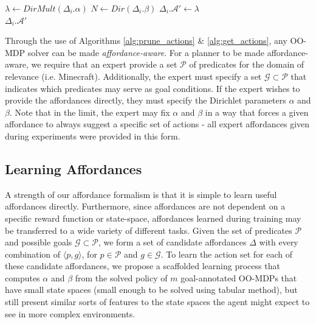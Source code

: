 \documentclass[letterpaper]{article}
\begin{document}
\begin{algorithm}
  \caption{$\Delta_i.getActions(s)$}
  \begin{algorithmic}[1]
    \State $\lambda \leftarrow DirMult(\Delta_i.\alpha)$
    \State $N \leftarrow Dir(\Delta_i.\beta)$
    \State $\Delta_i.\mathcal{A}' \leftarrow \lambda$
    \EndFor \\
    \Return $\Delta_i.\mathcal{A}'$
  \end{algorithmic}
  \label{alg:get_actions}
\end{algorithm}

Through the use of Algorithms \ref{alg:prune_actions} \& \ref{alg:get_actions}, any OO-MDP solver can be made
{\it affordance-aware}. For a planner to be made affordance-aware, we require that an expert provide a set $\mathcal{P}$ of predicates
for the domain of relevance (i.e. Minecraft). Additionally, the expert must specify a set
$\mathcal{G} \subset \mathcal{P}$ that indicates which predicates may serve as goal conditions. If the expert wishes
to provide the affordances directly, they must specify the Dirichlet parameters $\alpha$ and $\beta$. Note that
in the limit, the expert may fix $\alpha$ and $\beta$ in a way that forces a given
affordance to always suggest a specific set of actions - all expert affordances given during experiments
were provided in this form.

\subsection{Learning Affordances}

A strength of our affordance formalism is that it is simple to learn useful affordances directly. Furthermore, since affordances
are not dependent on a specific reward function or state-space, affordances learned during training may be transferred to a wide variety
of different tasks.
Given the set of predicates $\mathcal{P}$ and possible goals $\mathcal{G} \subset \mathcal{P}$, we form a set of candidate affordances $\Delta$ with every combination of $\langle p, g \rangle$, for $p \in \mathcal{P}$ and $g \in \mathcal{G}$.
To learn the action set for each of these candidate affordances, we propose a scaffolded learning process that computes $\alpha$ and $\beta$ from the
solved policy of $m$ goal-annotated OO-MDPs that have small state spaces (small enough to be solved using tabular method), but still present similar sorts of features to the state spaces the agent might expect to see in more complex environments.
\end{document}
